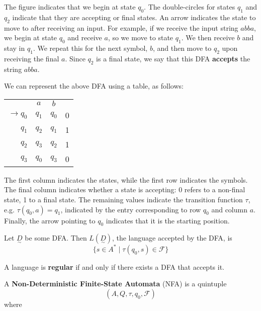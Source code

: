 The figure indicates that we begin at state \(q_0\). The double-circles for states \(q_1\) and \(q_2\) indicate that they are accepting or final states. An arrow indicates the state to move to after receiving an input. For example, if we receive the input string \(abba\), we begin at state \(q_0\) and receive \(a\), so we move to state \(q_1\). We then receive \(b\) and stay in \(q_1\). We repeat this for the next symbol, \(b\), and then move to \(q_2\) upon receiving the final \(a\). Since \(q_2\) is a final state, we say that this DFA \textbf{accepts} the string \(abba\). 

We can represent the above DFA using a table, as follows:

\begin{center}\begin{tabular}{r c c r}
         & \(a\) & \(b\) & \\\cmidrule{2-3}
    \(\to q_0\) & \(q_1\) & \(q_0\) & 0 \\
    \(q_1\) & \(q_2\) & \(q_1\) & 1 \\
    \(q_2\) & \(q_3\) & \(q_2\) & 1\\
    \(q_3\) & \(q_0\) & \(q_3\) & 0\\
\end{tabular}\end{center}

The first column indicates the states, while the first row indicates the symbols. The final column indicates whether a state is accepting: 0 refers to a non-final state, 1 to a final state. The remaining values indicate the transition function \(\tau \), e.g. \(\tau(q_0, a)=q_1\), indicated by the entry corresponding to row \(q_0\) and column \(a\). Finally, the arrow pointing to \(q_0\) indicates that it is the starting position. 

\begin{definition}
Let \(\underset{\sim}{D}\) be some DFA\@. Then \(L(\underset{\sim}{D})\), the language accepted by the DFA, is \[ \{s\in A^* \mid \tau(q_0, s)\in \mathcal{F}\} \]
\end{definition}

\begin{definition}
A language is \textbf{regular} if and only if there exists a DFA that accepts it.
\end{definition}

\begin{definition}
A \textbf{Non-Deterministic Finite-State Automata} (NFA) is a quintuple \[(A, Q, \tau, q_0, \mathcal{F})\] where 
\end{definition}

